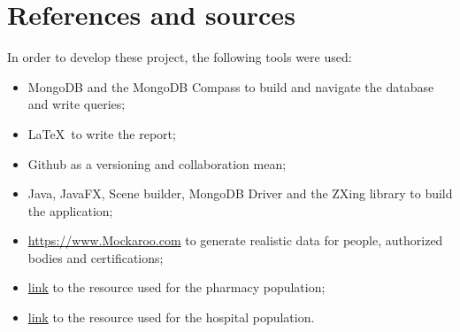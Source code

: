 \documentclass[12pt, a4paper]{article}
\begin{document}
\clearpage 

\section{References and sources}

In order to develop these project, the following tools were used:

\begin{itemize}
    \item MongoDB and the MongoDB Compass to build and navigate the database 
        and write queries;
    \item \LaTeX~to write the report;
    \item Github as a versioning and collaboration mean;
    \item Java, JavaFX, Scene builder, MongoDB Driver and the ZXing library to build 
        the application;
    \item \url{https://www.Mockaroo.com} 
        to generate realistic data for people, authorized bodies and 
        certifications;
    \item \href{https://data.gov.sg/dataset/listing-of-licensed-pharmacies}{link}
        to the resource used for the pharmacy population;
    \item \href{https://corgis-edu.github.io/corgis/csv/hospitals/}{link}
        to the resource used for the hospital population.
\end{itemize}

\clearpage
\end{document}
